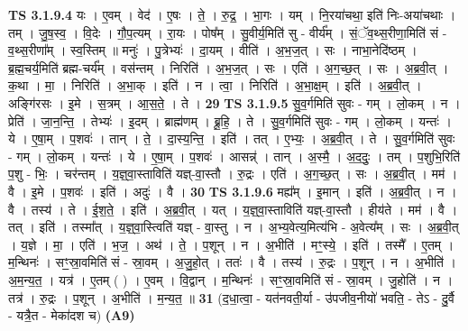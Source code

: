 \documentclass[17pt]{extarticle}
\begin{document}
                  \newline
                                \textbf{ TS 3.1.9.4} \newline
                  यः । ए॒वम् । वेद॑ । ए॒षः । ते॒ । रु॒द्र॒ । भा॒गः । यम् । नि॒रया॑चथा॒ इति॑ निः-अया॑चथाः । तम् । जु॒ष॒स्व॒ । वि॒देः । गौ॒प॒त्यम् । रा॒यः । पोष᳚म् । सु॒वीर्य॒मिति॑ सु - वीर्य᳚म् । सं॒ॅव॒थ्स॒रीणा॒मिति॑ सं - व॒थ्स॒रीणा᳚म् । स्व॒स्तिम् ॥ मनुः॑ । पु॒त्रेभ्यः॑ । दा॒यम् । वीति॑ । अ॒भ॒ज॒त् । सः । नाभा॒नेदि॑ष्ठम् । ब्र॒ह्म॒चर्य॒मिति॑ ब्रह्म-चर्य᳚म् । वस॑न्तम् । निरिति॑ । अ॒भ॒ज॒त् । सः । एति॑ । अ॒ग॒च्छ॒त् । सः । अ॒ब्र॒वी॒त् । क॒था । मा॒ । निरिति॑ । अ॒भा॒क् । इति॑ । न । त्वा॒ । निरिति॑ । अ॒भा॒क्ष॒म् । इति॑ । अ॒ब्र॒वी॒त् । अङ्गि॑रसः । इ॒मे । स॒त्रम् । आ॒स॒ते॒ । ते । \textbf{  29} \newline
                  \newline
                                \textbf{ TS 3.1.9.5} \newline
                  सु॒व॒र्गमिति॑ सुवः - गम् । लो॒कम् । न । प्रेति॑ । जा॒न॒न्ति॒ । तेभ्यः॑ । इ॒दम् । ब्राह्म॑णम् । ब्रू॒हि॒ । ते । सु॒व॒र्गमिति॑ सुवः - गम् । लो॒कम् । यन्तः॑ । ये । ए॒षा॒म् । प॒शवः॑ । तान् । ते॒ । दा॒स्य॒न्ति॒ । इति॑ । तत् । ए॒भ्यः॒ । अ॒ब्र॒वी॒त् । ते । सु॒व॒र्गमिति॑ सुवः - गम् । लो॒कम् । यन्तः॑ । ये । ए॒षा॒म् । प॒शवः॑ । आसन्न्॑ । तान् । अ॒स्मै॒ । अ॒द॒दुः॒ । तम् । प॒शुभि॒रिति॑ प॒शु - भिः॒ । चर॑न्तम् । य॒ज्ञ्॒वा॒स्ताविति॑ यज्ञ्-वा॒स्तौ । रु॒द्रः । एति॑ । अ॒ग॒च्छ॒त् । सः । अ॒ब्र॒वी॒त् । मम॑ । वै । इ॒मे । प॒शवः॑ । इति॑ । अदुः॑ । वै । \textbf{  30} \newline
                  \newline
                                \textbf{ TS 3.1.9.6} \newline
                  मह्य᳚म् । इ॒मान् । इति॑ । अ॒ब्र॒वी॒त् । न । वै । तस्य॑ । ते । ई॒श॒ते॒ । इति॑ । अ॒ब्र॒वी॒त् । यत् । य॒ज्ञ्॒वा॒स्ताविति॑ यज्ञ्-वा॒स्तौ । हीय॑ते । मम॑ । वै । तत् । इति॑ । तस्मा᳚त् । य॒ज्ञ्॒वा॒स्त्विति॑ यज्ञ् - वा॒स्तु । न । अ॒भ्य॒वेत्य॒मित्य॑भि - अ॒वेत्य᳚म् । सः । अ॒ब्र॒वी॒त् । य॒ज्ञे । मा॒ । एति॑ । भ॒ज॒ । अथ॑ । ते॒ । प॒शून् । न । अ॒भीति॑ । मꣳ॒॒स्ये॒ । इति॑ । तस्मै᳚ । ए॒तम् । म॒न्थिनः॑ । सꣳ॒॒स्रा॒वमिति॑ सं - स्रा॒वम् । अ॒जु॒हो॒त् । ततः॑ । वै । तस्य॑ । रु॒द्रः । प॒शून् । न । अ॒भीति॑ । अ॒म॒न्य॒त॒ । यत्र॑ । ए॒तम् ( ) । ए॒वम् । वि॒द्वान् । म॒न्थिनः॑ । सꣳ॒॒स्रा॒वमिति॑ सं - स्रा॒वम् । जु॒होति॑ । न । तत्र॑ । रु॒द्रः । प॒शून् । अ॒भीति॑ । म॒न्य॒त॒ ॥ \textbf{  31} \newline
                  \newline
                      (द॒धा॒त्वा॒ - यत॑नवती॒र्या - उ॑पजीव॒नीयो॑ भवति॒ - तेऽ - दु॒र्वै - यत्रै॒त - मेका॑दश च)  \textbf{(A9)} \newline \newline
\end{document}
